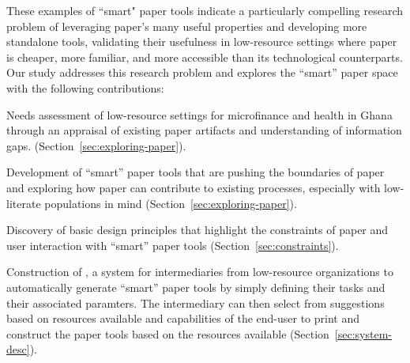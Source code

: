 \documentclass{sig-alternate}
\begin{document}
These examples of ``smart" paper tools indicate a particularly compelling research problem of leveraging paper's many useful properties and developing more standalone tools, validating their usefulness in low-resource settings where paper is cheaper, more familiar, and more accessible than its technological counterparts. Our study addresses this research problem and explores the ``smart'' paper space with the following contributions:

\begin{compactitem}

  \item Needs assessment of low-resource settings for microfinance and health in Ghana through an appraisal of existing paper artifacts and understanding of information gaps. (Section~\ref{sec:exploring-paper}).
  \item Development of ``smart'' paper tools that are pushing the boundaries of paper and exploring how paper can contribute to existing processes, especially with low-literate populations in mind (Section~\ref{sec:exploring-paper}).
  \item Discovery of basic design principles that highlight the constraints of paper and user interaction with ``smart'' paper tools (Section~\ref{sec:constraints}).
  \item Construction of \nifty, a system for intermediaries from low-resource organizations to automatically generate ``smart'' paper tools by simply defining their tasks and their associated paramters. The intermediary can then select from suggestions based on resources available and capabilities of the end-user to print and construct the paper tools based on the resources available (Section~\ref{sec:system-desc}). 

\end{compactitem}


\end{document}
